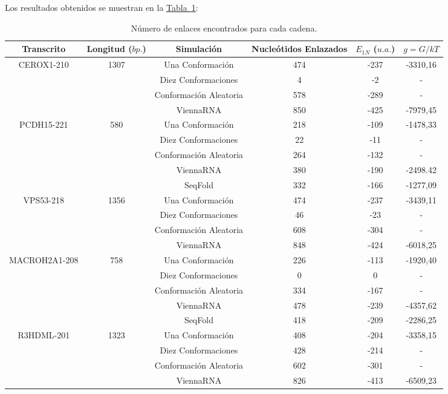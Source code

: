 \documentclass[a4paper,11pt,titlepage]{article}
\newcommand{\nr}[2][sección]{\hyperref[#2]{#1~\ref{#2}}}
\theoremstyle{definition}
\begin{document}
Los resultados obtenidos se muestran en la \nr[Tabla]{tab:linking}:

\begin{table}[H]
	\centering
    \begin{adjustbox}{width=0.80\textwidth}
	\begin{tabular}{cccccc}
	    \toprule
        Transcrito & Longitud ($bp.$) & Simulación & Nucleótidos Enlazados & $E_{1N}$ ($u.a.$) & $g = G/kT$ \\
		\midrule
        \multirow{4}{*}{CEROX1-210} & \multirow{4}{*}{1307} & Una Conformación & 474 & -237 & -3310,16 \\
        &  & Diez Conformaciones & 4 & -2 & - \\
        &  & Conformación Aleatoria & 578 & -289 & - \\
        &  & ViennaRNA & 850 & -425 & -7979,45 \\
        \midrule
        \multirow{5}{*}{PCDH15-221} & \multirow{5}{*}{580} & Una Conformación & 218 & -109 & -1478,33 \\
        &  & Diez Conformaciones & 22 & -11 & - \\
        &  & Conformación Aleatoria & 264 & -132 & - \\
        &  & ViennaRNA & 380 & -190 & -2498.42 \\
        &  & SeqFold & 332 & -166 & -1277,09 \\
        \midrule
        \multirow{4}{*}{VPS53-218} & \multirow{4}{*}{1356} & Una Conformación & 474 & -237 & -3439,11 \\
        &  & Diez Conformaciones & 46 & -23 & - \\
        &  & Conformación Aleatoria & 608 & -304 & - \\
        &  & ViennaRNA & 848 & -424 & -6018,25 \\
        \midrule
        \multirow{5}{*}{MACROH2A1-208} & \multirow{5}{*}{758} & Una Conformación & 226 & -113 & -1920,40 \\
        &  & Diez Conformaciones & 0 & 0 & - \\
        &  & Conformación Aleatoria & 334 & -167 & - \\
        &  & ViennaRNA & 478 & -239 & -4357,62 \\
        &  & SeqFold & 418 & -209 & -2286,25 \\
        \midrule
        \multirow{4}{*}{R3HDML-201} & \multirow{4}{*}{1323} & Una Conformación & 408 & -204 & -3358,15 \\
        &  & Diez Conformaciones & 428 & -214 & - \\
        &  & Conformación Aleatoria & 602 & -301 & - \\
        &  & ViennaRNA & 826 & -413 & -6509,23 \\
		\bottomrule
	\end{tabular}
    \end{adjustbox}
	\small{\caption{Número de enlaces encontrados para cada cadena.}}\normalsize
    \label{tab:linking}
\end{table}
\end{document}
